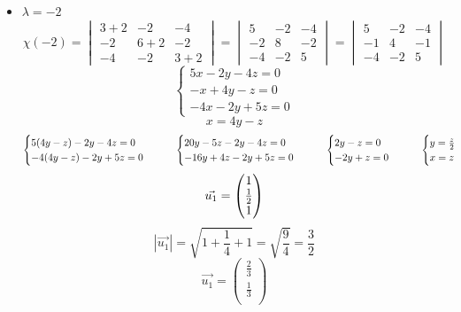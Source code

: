 \begin{itemize}
	\item $ \lambda = -2 $
    $$ \chi(-2) =
    \begin{vmatrix}
        3 + 2 & -2 & -4 \\
        -2 & 6 + 2 & -2 \\
        -4 & -2 & 3 + 2
    \end{vmatrix} =
    \begin{vmatrix}
        5 & -2 & -4 \\
        -2 & 8 & -2 \\
        -4 & -2 & 5
    \end{vmatrix} =
    \begin{vmatrix}
        5 & -2 & -4 \\
        -1 & 4 & -1 \\
        -4 & -2 & 5
    \end{vmatrix} $$
    $$
    \begin{cases}
    	5x - 2y - 4z = 0 \\
        -x + 4y - z = 0 \\
        -4x - 2y + 5z = 0
    \end{cases} $$
    $$ x = 4y - z $$
    $$
    \begin{cases}
    	5(4y - z) - 2y - 4z = 0 \\
        -4(4y - z) - 2y + 5z = 0
    \end{cases} \qquad
    \begin{cases}
    	20y - 5z - 2y - 4z = 0 \\
        -16y + 4z - 2y + 5z = 0
    \end{cases} \qquad
    \begin{cases}
    	2y - z = 0 \\
        -2y + z = 0
    \end{cases} \qquad
    \begin{cases}
    	y = \half[z] \\
        x = z
    \end{cases} $$
    $$ \vec{u_1} =
    \begin{pmatrix}
    	1 \\
        \half \\
        1
    \end{pmatrix} $$
    $$ |\vec{u_1}| = \sqrt{1 + \frac14 + 1} = \sqrt{\frac94} = \frac32 $$
    $$ \vec{u_1} =
    \begin{pmatrix}
    	\frac23 \\
        \frac13 \\

\end{pmatrix}$$
\end{itemize}
